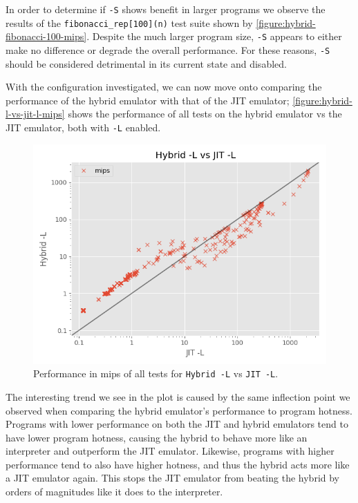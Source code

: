In order to determine if \texttt{-S} shows benefit in larger programs we observe the results of the \texttt{fibonacci\_rep[100](n)} test suite shown by \autoref{figure:hybrid-fibonacci-100-mips}. Despite the much larger program size, \texttt{-S} appears to either make no difference or degrade the overall performance. For these reasons, \texttt{-S} should be considered detrimental in its current state and disabled.

With the configuration investigated, we can now move onto comparing the performance of the hybrid emulator with that of the JIT emulator; \autoref{figure:hybrid-l-vs-jit-l-mips} shows the performance of all tests on the hybrid emulator vs the JIT emulator, both with \texttt{-L} enabled.

\begin{figure}[H]
    \centering
    \includegraphics[scale=0.75]{output/graphs/scatter/vs/JIT -L-vs-Hybrid -L-mips.png}
    \caption{Performance in mips of all tests for \texttt{Hybrid -L} vs \texttt{JIT -L}.}
    \label{figure:hybrid-l-vs-jit-l-mips}
\end{figure}

The interesting trend we see in the plot is caused by the same inflection point we observed when comparing the hybrid emulator's performance to program hotness. Programs with lower performance on both the JIT and hybrid emulators tend to have lower program hotness, causing the hybrid to behave more like an interpreter and outperform the JIT emulator. Likewise, programs with higher performance tend to also have higher hotness, and thus the hybrid acts more like a JIT emulator again. This stops the JIT emulator from beating the hybrid by orders of magnitudes like it does to the interpreter.

